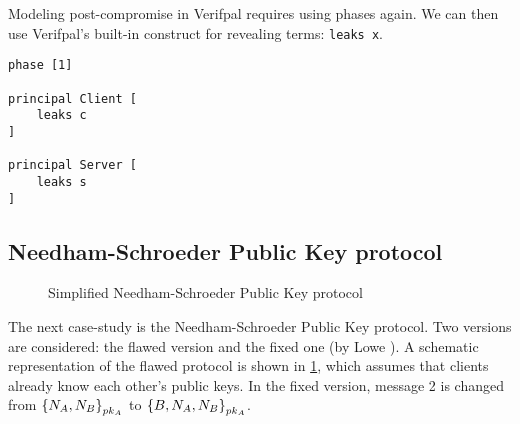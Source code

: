 \lstset{language=verifpal}
Modeling post-compromise in Verifpal requires using phases again. We can then use Verifpal's built-in construct for revealing terms: \lstinline{leaks x}.
\newpage
\begin{lstlisting}
phase [1]

principal Client [
    leaks c
]

principal Server [
    leaks s
]
\end{lstlisting}

\subsection{Needham-Schroeder Public Key protocol}
\label{sec:NSPK}

\begin{figure}[t]
    \setmscoptions
    \begin{msc}{}
    
    

    \nextlevel[4]


    \nextlevel[3]    
    \nextlevel



    \nextlevel[3]
    \nextlevel[2]

    \end{msc}

    \centering
    \caption{Simplified Needham-Schroeder Public Key protocol}
    \label{fig:NSPK}
\end{figure}

The next case-study is the Needham-Schroeder Public Key protocol. Two versions are considered: the flawed version and the fixed one (by Lowe \cite{NSPK_LoweGavin}). A schematic representation of the flawed protocol is shown in \cref{fig:NSPK}, which assumes that clients already know each other's public keys. In the fixed version, message 2 is changed from $\left\{N_A, N_B\right\}_{pk_{A}}$ to $\left\{B, N_A, N_B\right\}_{pk_{A}}$.

